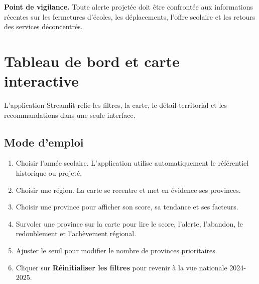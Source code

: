 \documentclass[12pt,a4paper]{article}
\newcommand{\note}[1]{\colorbox{SoftOrange}{\parbox{0.96\linewidth}{\textbf{\color{Orange}Point de vigilance.} #1}}}
\begin{document}
\note{Toute alerte projetée doit être confrontée aux informations récentes sur les fermetures d'écoles, les déplacements, l'offre scolaire et les retours des services déconcentrés.}
\clearpage
\thispagestyle{fancy}

\section{Tableau de bord et carte interactive}
L'application Streamlit relie les filtres, la carte, le détail territorial et les recommandations dans une seule interface.

\begin{center}
\end{center}

\subsection{Mode d'emploi}
\begin{enumerate}
  \item Choisir l'année scolaire. L'application utilise automatiquement le référentiel historique ou projeté.
  \item Choisir une région. La carte se recentre et met en évidence ses provinces.
  \item Choisir une province pour afficher son score, sa tendance et ses facteurs.
  \item Survoler une province sur la carte pour lire le score, l'alerte, l'abandon, le redoublement et l'achèvement régional.
  \item Ajuster le seuil pour modifier le nombre de provinces prioritaires.
  \item Cliquer sur \textbf{Réinitialiser les filtres} pour revenir à la vue nationale 2024-2025.
\end{enumerate}
\end{document}
